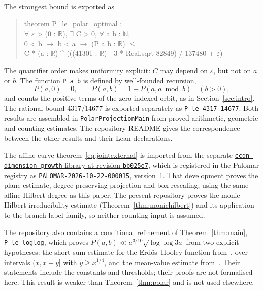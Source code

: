 \documentclass[11pt]{article}
\theoremstyle{definition}
\theoremstyle{remark}
\newcommand{\lean}[1]{\nolinkurl{#1}}
\begin{document}
The strongest bound is exported as
\begin{quote}\ttfamily\small
theorem P\_le\_polar\_optimal :\\
\hspace*{2em}$\forall$ $\varepsilon$ > (0 : $\mathbb R$), $\exists$ C > 0, $\forall$ a b : $\mathbb N$,\\
\hspace*{2em}0 < b $\to$ b < a $\to$ (P a b : $\mathbb R$) $\le$\\
\hspace*{2em}C * (a : $\mathbb R$) \^{} (((41301 : $\mathbb R$) - 3 * Real.sqrt 82849) / 137480 + $\varepsilon$)
\end{quote}
The quantifier order makes uniformity explicit: $C$ may depend on
$\varepsilon$, but not on $a$ or $b$. The function \texttt{P a b} is defined
by well-founded recursion,
\[
 P(a,0)=0,\qquad P(a,b)=1+P(a,a\bmod b)\quad(b>0),
\]
and counts the positive terms of the zero-indexed orbit, as in Section~\ref{sec:intro}.
The rational bound $4317/14677$ is exported separately as
\lean{P_le_4317_14677}. Both results are assembled in
\lean{PolarProjectionMain} from proved arithmetic, geometric and
counting estimates. The repository README gives the correspondence between
the other results and their Lean declarations.

The affine-curve theorem~\eqref{eq:jointexternal} is imported from the separate
\href{https://github.com/jasondavies/ccdn-dimension-growth/tree/bb025e7207f3a35a21b898629f5678b72aa7e44f}{\lean{ccdn-dimension-growth} library at revision \lean{bb025e7}},
which is registered in the Palomar registry as \lean{PALOMAR-2026-10-22-000015}, version~1.
That development proves the plane estimate, degree-preserving projection
and box rescaling, using the same affine Hilbert degree as this paper.
The present repository proves the monic Hilbert irreducibility estimate
(Theorem~\ref{thm:monichilbert}) and its application to the branch-label
family, so neither counting input is assumed.

The repository also contains a conditional refinement of
Theorem~\ref{thm:main}, \lean{P_le_loglog}, which proves
$P(a,b)\ll a^{3/10}\sqrt{\log\log3a}$ from two explicit hypotheses: the
short-sum estimate for the Erd\H{o}s--Hooley function from~\cite{NT}, over
intervals $(x,x+y]$ with $y\ge x^{1/4}$, and the mean-value estimate
from~\cite{BT}. Their statements include the constants and thresholds; their
proofs are not formalised here. This result is weaker than
Theorem~\ref{thm:polar} and is not used elsewhere.
\end{document}
